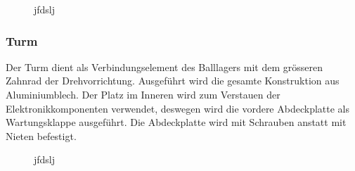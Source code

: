 \begin{figure}[h!]          
	\centering             
	\caption{jfdslj}
	\label{fig:hhjfdhfd}        
\end{figure}

\subsubsection{Turm}
Der Turm dient als Verbindungselement des Balllagers mit dem grösseren Zahnrad 
der Drehvorrichtung. Ausgeführt wird die gesamte Konstruktion aus 
Aluminiumblech. Der Platz im Inneren wird zum Verstauen der 
Elektronikkomponenten verwendet, deswegen wird die vordere Abdeckplatte als 
Wartungsklappe ausgeführt. Die Abdeckplatte wird mit Schrauben anstatt mit 
Nieten befestigt.

\begin{figure}[h!]          
	\centering             
	\caption{jfdslj}
	\label{fig:hhjfdhfd}        
\end{figure}

\clearpage

